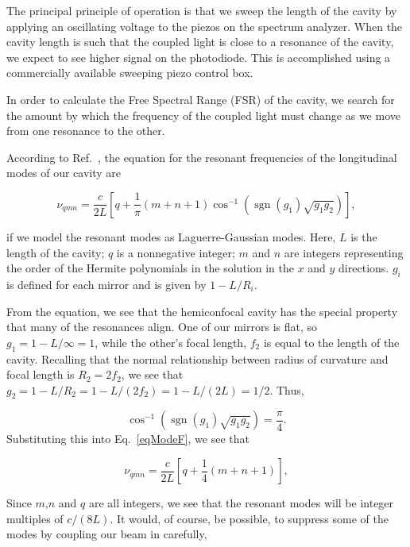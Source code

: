 The principal principle of operation is that we sweep the length of the cavity by applying an oscillating voltage to the piezos on the spectrum analyzer. When the cavity length is such that the coupled light is close to a resonance of the cavity, we expect to see higher signal on the photodiode. 
This is accomplished using a commercially available sweeping piezo control box. 


In order to calculate the Free Spectral Range (FSR) of the cavity, we search for the amount by which the frequency of the coupled light must change as we move from one resonance to the other. 

According to Ref.\ \cite{lasersMilonniEberly}, the equation for the resonant frequencies of the longitudinal modes of our cavity are

\begin{equation} \label{eqModeF}
\nu_{qmn}=\frac{c}{2L}\left[q + \frac{1}{\pi}(m+n+1)\cos^{-1}(\operatorname{sgn}(g_1)\sqrt{g_1 g_2})\right], 
\end{equation}

if we model the resonant modes as Laguerre-Gaussian modes. Here, $L$ is the length of the cavity; $q$ is a nonnegative integer; $m$ and $n$ are integers representing the order of the Hermite polynomials in the solution in the $x$ and $y$ directions. $g_i$ is defined for each mirror and is given by $1-L/R_i$.

From the equation, we see that the hemiconfocal cavity has the special property that many of the resonances align. One of our mirrors is flat, so $g_1=1-L/\infty=1$, while the other's focal length, $f_2$ is equal to the length of the cavity. Recalling that the normal relationship between radius of curvature and focal length is $R_2=2 f_2$, we see that $g_2=1-L/R_2=1-L/(2 f_2)=1-L/(2 L)=1/2$. Thus, 

\begin{equation}
\cos^{-1}(\operatorname{sgn}(g_1)\sqrt{g_1 g_2})=\frac{\pi}{4}.
\end{equation}
Substituting this into Eq.\ \ref{eqModeF}, we see that 

\begin{equation}
\nu_{qmn}=\frac{c}{2L}\left[q + \frac{1}{4}(m+n+1)\right], 
\end{equation}

Since $m$,$n$ and $q$ are all integers, we see that the resonant modes will be integer multiples of $c/(8L)$. It would, of course, be possible, to suppress some of the modes by coupling our beam in carefully, 

